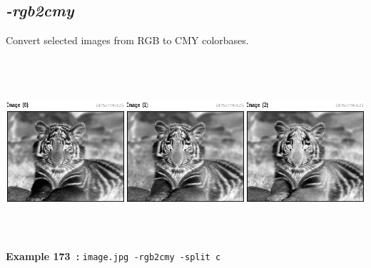 \documentclass[a4paper,11pt,twoside]{book}
\begin{document}
\subsection{\emph{-rgb2cmy} }\vspace*{-0.5em}
Convert selected images from RGB to CMY colorbases.
\begin{center}\includegraphics[keepaspectratio=true,height=7cm,width=\textwidth]{img/gmic_def173.jpg}\\
{\footnotesize \textbf{Example 173~:} \texttt{image.jpg -rgb2cmy -split c}}
\end{center}
\end{document}
